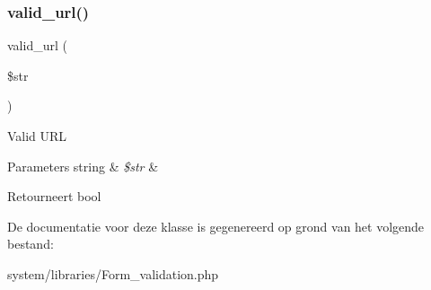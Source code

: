 \subsubsection{\texorpdfstring{valid\_url()}{valid\_url()}}
{\footnotesize\ttfamily valid\+\_\+url (\begin{DoxyParamCaption}\item[{}]{\$str }\end{DoxyParamCaption})}

Valid U\+RL


\begin{DoxyParams}[1]{Parameters}
string & {\em \$str} & \\
\hline
\end{DoxyParams}
\begin{DoxyReturn}{Retourneert}
bool 
\end{DoxyReturn}


De documentatie voor deze klasse is gegenereerd op grond van het volgende bestand\+:\begin{DoxyCompactItemize}
\item 
system/libraries/Form\+\_\+validation.\+php\end{DoxyCompactItemize}
